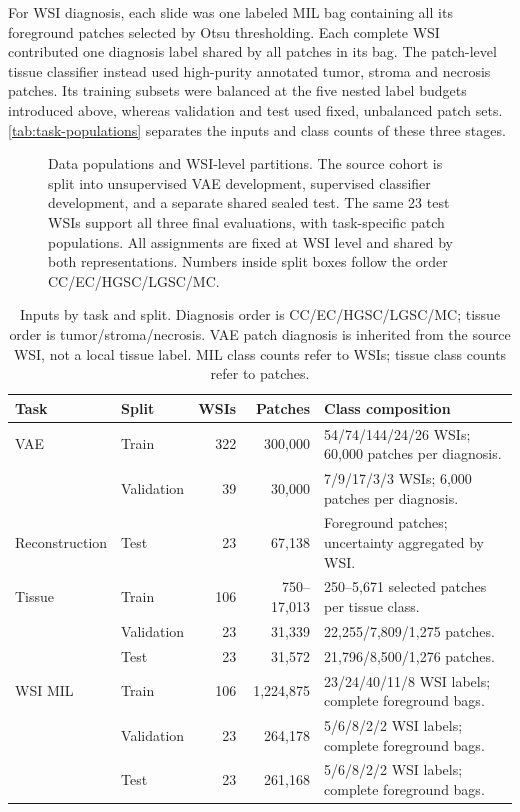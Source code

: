 \documentclass[conference,a4paper]{IEEEtran}
\begin{document}
For WSI diagnosis, each slide was one labeled MIL bag containing all its
foreground patches selected by Otsu thresholding. Each complete WSI contributed
one diagnosis label shared by all patches in its bag. The patch-level tissue classifier
instead used high-purity annotated tumor, stroma and necrosis patches. Its
training subsets were balanced at the five nested label budgets introduced
above, whereas validation
and test used fixed, unbalanced patch sets. \autoref{tab:task-populations}
separates the inputs and class counts of these three stages.

\begin{figure}[t]
\centering
\resizebox{0.98\textwidth}{!}{}
\caption{Data populations and WSI-level partitions. The source cohort is
split into unsupervised VAE development, supervised classifier development,
and a separate shared sealed test. The same 23 test WSIs support all three
final evaluations, with task-specific patch populations. All assignments are
fixed at WSI level and shared by both representations. Numbers inside split
boxes follow the order CC/EC/HGSC/LGSC/MC.}
\label{fig:data-split}
\end{figure}

\begin{table}[t]
\caption{Inputs by task and split. Diagnosis order is CC/EC/HGSC/LGSC/MC;
tissue order is tumor/stroma/necrosis. VAE patch diagnosis is inherited from
the source WSI, not a local tissue label. MIL class counts refer to WSIs;
tissue class counts refer to patches.}
\label{tab:task-populations}
\centering
\footnotesize
\begin{tabular}{llrrp{}}
\toprule
Task & Split & WSIs & Patches & Class composition \\
\midrule
VAE & Train & 322 & 300,000 & 54/74/144/24/26 WSIs; 60,000 patches per diagnosis. \\
 & Validation & 39 & 30,000 & 7/9/17/3/3 WSIs; 6,000 patches per diagnosis. \\
\midrule
Reconstruction & Test & 23 & 67,138 & Foreground patches; uncertainty aggregated by WSI. \\
\midrule
Tissue & Train & 106 & 750--17,013 & 250--5,671 selected patches per tissue class. \\
 & Validation & 23 & 31,339 & 22,255/7,809/1,275 patches. \\
 & Test & 23 & 31,572 & 21,796/8,500/1,276 patches. \\
\midrule
WSI MIL & Train & 106 & 1,224,875 & 23/24/40/11/8 WSI labels; complete foreground bags. \\
 & Validation & 23 & 264,178 & 5/6/8/2/2 WSI labels; complete foreground bags. \\
 & Test & 23 & 261,168 & 5/6/8/2/2 WSI labels; complete foreground bags. \\
\bottomrule
\end{tabular}
\end{table}
\end{document}
